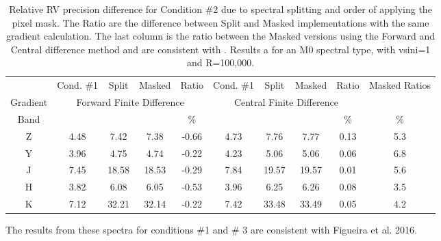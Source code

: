 
\begin{table}
    \caption{Relative {RV} precision difference for Condition \#2 due to spectral splitting and order of applying the pixel mask. The Ratio are the difference between Split and Masked implementations with the same gradient calculation. The last column is the ratio between the Masked versions using the Forward and Central difference method and are consistent with . Results a for an M0 spectral type, with vsini=1 and R=100,000.}
    \begin{tabular}{c|cccc|cccc|c}
        \toprule
        & Cond. \#1 & Split & Masked & Ratio &  Cond. \#1 & Split & Masked & Ratio & Masked Ratios\\
        Gradient &  \multicolumn{4}{c|}{Forward Finite Difference}  &  \multicolumn{4}{c|}{Central Finite Difference} & \\
        
        Band & \mps{} & \mps{} & \mps{} &  \%  & \mps{} & \mps{} & \mps{} &   \% & \% \\
        \midrule
   
        Z & 4.48 &  7.42 &  7.38 & -0.66 &  4.73 &  7.76 &  7.77 & 0.13 & 5.3\\
        Y & 3.96 &  4.75 &  4.74 & -0.22 &  4.23 &  5.06 &  5.06 & 0.06 & 6.8\\
        J & 7.45 & 18.58 & 18.53 & -0.29 &  7.84 & 19.57 & 19.57 & 0.01 & 5.6\\
        H & 3.82 &  6.08 &  6.05 & -0.53 &  3.96 &  6.25 &  6.26 & 0.08 & 3.5\\
        K & 7.12 & 32.21 & 32.14 & -0.22 &  7.42 & 33.48 & 33.49 & 0.05 & 4.2\\
        \bottomrule
    \end{tabular}
\end{table}

{\red{} The results from these spectra for conditions \#1 and \# 3 are consistent with Figueira et al. 2016. }
